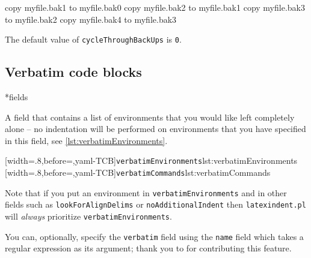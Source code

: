  \begin{commandshell}
copy myfile.bak1 to myfile.bak0
copy myfile.bak2 to myfile.bak1
copy myfile.bak3 to myfile.bak2
copy myfile.bak4 to myfile.bak3
\end{commandshell}

 The default value of \texttt{cycleThroughBackUps} is \texttt{0}.

\subsection{Verbatim code blocks}
*{fields}

 A field that contains a list of environments that you would like left completely alone
 -- no indentation will be performed on environments that you have specified in this
 field, see \cref{lst:verbatimEnvironments}. 

 \begin{cmhtcbraster}[raster column skip=.1\linewidth]
  [width=.8\linewidth,before=\centering,yaml-TCB]{\texttt{verbatimEnvironments}}{lst:verbatimEnvironments}
  [width=.8\linewidth,before=\centering,yaml-TCB]{\texttt{verbatimCommands}}{lst:verbatimCommands}
 \end{cmhtcbraster}

 Note that if you put an environment in \texttt{verbatimEnvironments} and in other fields
 such as \texttt{lookForAlignDelims} or \texttt{noAdditionalIndent} then
 \texttt{latexindent.pl} will \emph{always} prioritize \texttt{verbatimEnvironments}.

 You can, optionally, specify  the
 \texttt{verbatim} field using the \texttt{name} field which takes a regular expression
 as its argument; thank you to \cite{XuehaiPan} for contributing this feature.

